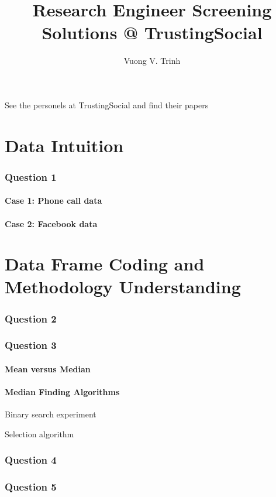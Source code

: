 \documentclass[11pt]{article}
\title{Research Engineer Screening Solutions @ TrustingSocial}
\author{Vuong V. Trinh}
\date{}
\theoremstyle{problemstyle}
\begin{document}
\maketitle

See the personels at TrustingSocial and find their papers

\part{Data Intuition}

\section{Question 1}

\cite{oskarsdottir2019}

\subsection{Case 1: Phone call data}

\subsection{Case 2: Facebook data}

\part{Data Frame Coding and Methodology Understanding}

\section{Question 2}

\section{Question 3}

\subsection{Mean versus Median}

\subsection{Median Finding Algorithms}

Binary search experiment

Selection algorithm

\section{Question 4}

\section{Question 5}



\end{document}
